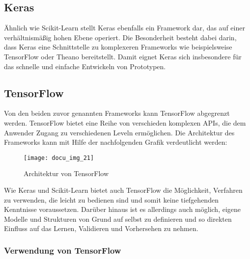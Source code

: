 \subsection{Keras}

Ähnlich wie Scikit-Learn stellt Keras ebenfalls ein Framework dar, das auf einer verhältnismäßig hohen Ebene operiert.
Die Besonderheit besteht dabei darin, dass Keras eine Schnittstelle zu komplexeren Frameworks wie beispielsweise
TensorFlow oder Theano bereitstellt. Damit eignet Keras sich insbesondere für das schnelle und einfache Entwickeln von
Prototypen.

\subsection{TensorFlow}

Von den beiden zuvor genannten Frameworks kann TensorFlow abgegrenzt werden. TensorFlow bietet eine Reihe von
verschieden komplexen APIs, die dem Anwender Zugang zu verschiedenen Leveln ermöglichen. Die Architektur des Frameworks
kann mit Hilfe der nachfolgenden Grafik verdeutlicht werden:

\begin{figure}[h]
    \centering
    \texttt{[image: docu\_img\_21]}
    \caption{Architektur von TensorFlow}
    \label{fig:tf-api}
\end{figure}

Wie Keras und Scikit-Learn bietet auch TensorFlow die Möglichkeit, Verfahren zu verwenden, die leicht zu bedienen sind
und somit keine tiefgehenden Kenntnisse voraussetzen. Darüber hinaus ist es allerdings auch möglich, eigene Modelle und
Strukturen von Grund auf selbst zu definieren und so direkten Einfluss auf das Lernen, Validieren und Vorhersehen zu
nehmen.

\subsubsection{Verwendung von TensorFlow}


